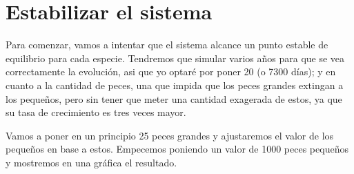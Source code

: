 \documentclass[11pt,a4paper]{report}
\begin{document}
\section{Estabilizar el sistema}

Para comenzar, vamos a intentar que el sistema alcance un punto estable de equilibrio para cada especie. Tendremos que simular varios años
para que se vea correctamente la evolución, asi que yo optaré por poner 20 (o 7300 días); y en cuanto a la cantidad de peces, una que impida
que los peces grandes extingan a los pequeños, pero sin tener que meter una cantidad exagerada de estos, ya que su tasa de crecimiento es
tres veces mayor.

Vamos a poner en un principio 25 peces grandes y ajustaremos el valor de los pequeños en base a estos. Empecemos poniendo un valor de 1000
peces pequeños y mostremos en una gráfica el resultado.
\end{document}
